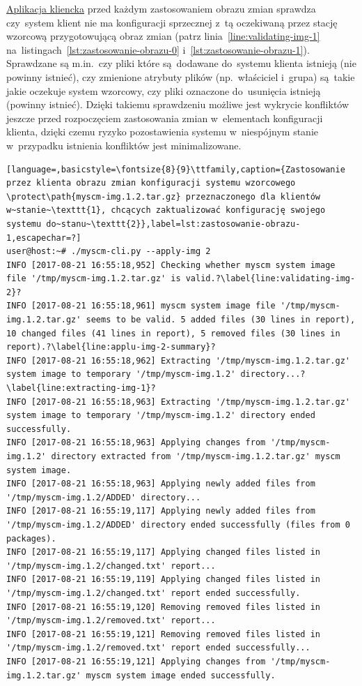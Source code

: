 \documentclass[thesis]{subfiles}
\begin{document}
\hyperref[sec:cli-app]{Aplikacja kliencka} przed każdym zastosowaniem obrazu zmian sprawdza czy~system klient nie ma konfiguracji sprzecznej z~tą oczekiwaną przez stację wzorcową przygotowującą obraz zmian (patrz linia~\ref{line:validating-img-1} na~listingach~\ref{lst:zastosowanie-obrazu-0} i~\ref{lst:zastosowanie-obrazu-1}). Sprawdzane są m.in.~czy pliki które są~dodawane do~systemu klienta istnieją (nie powinny istnieć), czy zmienione atrybuty plików (np.~właściciel i~grupa) są~takie jakie oczekuje system wzorcowy, czy pliki oznaczone do~usunięcia istnieją (powinny istnieć). Dzięki takiemu sprawdzeniu możliwe jest wykrycie konfliktów jeszcze przed rozpoczęciem zastosowania zmian w~elementach konfiguracji klienta, dzięki czemu ryzyko pozostawienia systemu w~niespójnym stanie w~przypadku istnienia konfliktów jest minimalizowane.

\begin{lstlisting}[language=,basicstyle=\fontsize{8}{9}\ttfamily,caption={Zastosowanie przez klienta obrazu zmian konfiguracji systemu wzorcowego \protect\path{myscm-img.1.2.tar.gz} przeznaczonego dla klientów w~stanie~\texttt{1}, chcących zaktualizować konfigurację swojego systemu do~stanu~\texttt{2}},label=lst:zastosowanie-obrazu-1,escapechar=?]
user@host:~# ./myscm-cli.py --apply-img 2
INFO [2017-08-21 16:55:18,952] Checking whether myscm system image file '/tmp/myscm-img.1.2.tar.gz' is valid.?\label{line:validating-img-2}?
INFO [2017-08-21 16:55:18,961] myscm system image file '/tmp/myscm-img.1.2.tar.gz' seems to be valid. 5 added files (30 lines in report), 10 changed files (41 lines in report), 5 removed files (30 lines in report).?\label{line:applu-img-2-summary}?
INFO [2017-08-21 16:55:18,962] Extracting '/tmp/myscm-img.1.2.tar.gz' system image to temporary '/tmp/myscm-img.1.2' directory...?\label{line:extracting-img-1}?
INFO [2017-08-21 16:55:18,963] Extracting '/tmp/myscm-img.1.2.tar.gz' system image to temporary '/tmp/myscm-img.1.2' directory ended successfully.
INFO [2017-08-21 16:55:18,963] Applying changes from '/tmp/myscm-img.1.2' directory extracted from '/tmp/myscm-img.1.2.tar.gz' myscm system image.
INFO [2017-08-21 16:55:18,963] Applying newly added files from '/tmp/myscm-img.1.2/ADDED' directory...
INFO [2017-08-21 16:55:19,117] Applying newly added files from '/tmp/myscm-img.1.2/ADDED' directory ended successfully (files from 0 packages).
INFO [2017-08-21 16:55:19,117] Applying changed files listed in '/tmp/myscm-img.1.2/changed.txt' report...
INFO [2017-08-21 16:55:19,119] Applying changed files listed in '/tmp/myscm-img.1.2/changed.txt' report ended successfully.
INFO [2017-08-21 16:55:19,120] Removing removed files listed in '/tmp/myscm-img.1.2/removed.txt' report...
INFO [2017-08-21 16:55:19,121] Removing removed files listed in '/tmp/myscm-img.1.2/removed.txt' report ended successfully...
INFO [2017-08-21 16:55:19,121] Applying changes from '/tmp/myscm-img.1.2.tar.gz' myscm system image ended successfully.
\end{lstlisting}
\end{document}
